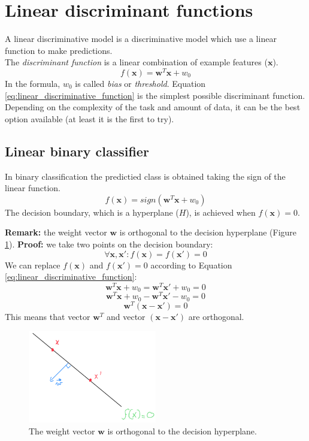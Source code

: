 \section{Linear discriminant functions}
A linear discriminative model is a discriminative model which use a linear function
to make predictions.\\ The \textit{discriminant function} is a linear
combination of example features ($\pmb{x}$).
\begin{equation}
	\label{eq:linear_discriminative_function}f(\pmb{x}) = \pmb{w}^{T}\pmb{x}+ w_{0}
\end{equation}
In the formula, $w_{0}$ is called \textit{bias} or \textit{threshold}. Equation \ref{eq:linear_discriminative_function}
is the simplest possible discriminant function. Depending on the complexity of
the task and amount of data, it can be the best option available (at least it is
the first to try).

\subsection{Linear binary classifier}
In binary classification the predictied class is obtained taking the sign of the
linear function.
\begin{equation}
	f(\pmb{x}) = \mathit{sign}(\pmb{w}^{T}\pmb{x}+ w_{0})
\end{equation}
The decision boundary, which is a hyperplane ($H$), is achieved when
$f(\pmb{x})=0$.
\newline

\textbf{Remark:} the weight vector $\pmb{w}$ is orthogonal to the decision hyperplane
(Figure \ref{fig:linearBinaryClassifier}). \textbf{Proof:} we take two points on
the decision boundary:
\[
	\forall \pmb{x}, \pmb{x}' : f(\pmb{x}) = f(\pmb{x}') = 0
\]
We can replace $f(\pmb{x})$ and $f(\pmb{x}') = 0$ according to Equation
\ref{eq:linear_discriminative_function}:
\[
	\pmb{w}^{T}\pmb{x}+ w_{0}= \pmb{w}^{T}\pmb{x}' + w_{0}= 0
\]
\[
	\pmb{w}^{T}\pmb{x}+ w_{0}- \pmb{w}^{T}\pmb{x}' - w_{0}= 0
\]
\[
	\pmb{w}^{T}(\pmb{x}- \pmb{x}') = 0
\]
This means that vector $\pmb{w}^{T}$ and vector $(\pmb{x}- \pmb{x}')$ are orthogonal.

\begin{figure}[H]
	\centering
	\includegraphics[width=0.5\textwidth]{
		images/12_LinearDiscriminantFunctions_linearBinaryClassifier.png
	}
	\caption{The weight vector $\pmb{w}$ is orthogonal to the decision hyperplane.}
	\label{fig:linearBinaryClassifier}
\end{figure}

